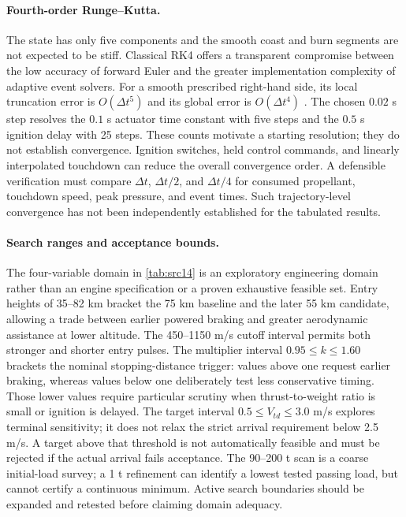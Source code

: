 \documentclass[11pt,a4paper]{article}
\begin{document}
\paragraph{Fourth-order Runge--Kutta.}
The state has only five components and the smooth coast and burn segments are not expected to be stiff. Classical RK4 offers a transparent compromise between the low accuracy of forward Euler and the greater implementation complexity of adaptive event solvers. For a smooth prescribed right-hand side, its local truncation error is $O(\Delta t^5)$ and its global error is $O(\Delta t^4)$ \cite{hairer}. The chosen $0.02$ s step resolves the $0.1$ s actuator time constant with five steps and the $0.5$ s ignition delay with 25 steps. These counts motivate a starting resolution; they do not establish convergence. Ignition switches, held control commands, and linearly interpolated touchdown can reduce the overall convergence order. A defensible verification must compare $\Delta t$, $\Delta t/2$, and $\Delta t/4$ for consumed propellant, touchdown speed, peak pressure, and event times. Such trajectory-level convergence has not been independently established for the tabulated results.

\paragraph{Search ranges and acceptance bounds.}
The four-variable domain in \cref{tab:src14} is an exploratory engineering domain rather than an engine specification or a proven exhaustive feasible set. Entry heights of 35--82 km bracket the 75 km baseline and the later 55 km candidate, allowing a trade between earlier powered braking and greater aerodynamic assistance at lower altitude. The 450--1150 m/s cutoff interval permits both stronger and shorter entry pulses. The multiplier interval $0.95\le k\le1.60$ brackets the nominal stopping-distance trigger: values above one request earlier braking, whereas values below one deliberately test less conservative timing. Those lower values require particular scrutiny when thrust-to-weight ratio is small or ignition is delayed. The target interval $0.5\le V_{td}\le3.0$ m/s explores terminal sensitivity; it does not relax the strict arrival requirement below 2.5 m/s. A target above that threshold is not automatically feasible and must be rejected if the actual arrival fails acceptance. The 90--200 t scan is a coarse initial-load survey; a 1 t refinement can identify a lowest tested passing load, but cannot certify a continuous minimum. Active search boundaries should be expanded and retested before claiming domain adequacy.
\end{document}
